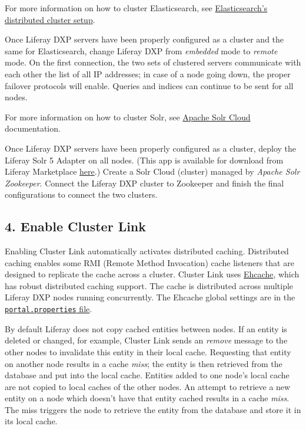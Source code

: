 For more information on how to cluster Elasticsearch, see
\href{https://www.elastic.co/guide/en/elasticsearch/guide/current/distributed-cluster.html}{Elasticsearch's
distributed cluster setup}.

Once Liferay DXP servers have been properly configured as a cluster and
the same for Elasticsearch, change Liferay DXP from \emph{embedded} mode
to \emph{remote} mode. On the first connection, the two sets of
clustered servers communicate with each other the list of all IP
addresses; in case of a node going down, the proper failover protocols
will enable. Queries and indices can continue to be sent for all nodes.

For more information on how to cluster Solr, see
\href{https://cwiki.apache.org/confluence/display/solr/SolrCloud}{Apache
Solr Cloud} documentation.

Once Liferay DXP servers have been properly configured as a cluster,
deploy the Liferay Solr 5 Adapter on all nodes. (This app is available
for download from Liferay Marketplace
\href{https://web.liferay.com/marketplace/-/mp/application/78803813}{here}.)
Create a Solr Cloud (cluster) managed by \emph{Apache Solr Zookeeper}.
Connect the Liferay DXP cluster to Zookeeper and finish the final
configurations to connect the two clusters.

\subsection{4. Enable Cluster Link}\label{enable-cluster-link}

Enabling Cluster Link automatically activates distributed caching.
Distributed caching enables some RMI (Remote Method Invocation) cache
listeners that are designed to replicate the cache across a cluster.
Cluster Link uses \href{http://www.ehcache.org}{Ehcache}, which has
robust distributed caching support. The cache is distributed across
multiple Liferay DXP nodes running concurrently. The Ehcache global
settings are in the
\href{@platform-ref@/7.0-latest/propertiesdoc/portal.properties.html\#Ehcache}{\texttt{portal.properties}
file}.

By default Liferay does not copy cached entities between nodes. If an
entity is deleted or changed, for example, Cluster Link sends an
\emph{remove} message to the other nodes to invalidate this entity in
their local cache. Requesting that entity on another node results in a
cache \emph{miss}; the entity is then retrieved from the database and
put into the local cache. Entities added to one node's local cache are
not copied to local caches of the other nodes. An attempt to retrieve a
new entity on a node which doesn't have that entity cached results in a
cache \emph{miss}. The miss triggers the node to retrieve the entity
from the database and store it in its local cache.

